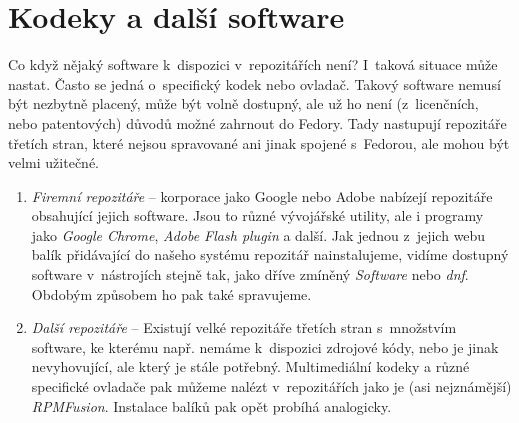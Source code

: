 \section*{Kodeky a další software}
Co když nějaký software k~dispozici v~repozitářích není? I~taková situace může nastat. Často se jedná o~specifický kodek nebo ovladač. Takový software nemusí být nezbytně placený, může být volně dostupný, ale už ho není (z~licenčních, nebo patentových) důvodů možné zahrnout do Fedory. Tady nastupují repozitáře třetích stran, které nejsou spravované ani jinak spojené s~Fedorou, ale mohou být velmi užitečné.

\begin{enumerate}
\item \emph{Firemní repozitáře} -- korporace jako Google nebo Adobe nabízejí repozitáře obsahující jejich software. Jsou to různé vývojářské utility, ale i programy jako \emph{Google Chrome}, \emph{Adobe Flash plugin} a další. Jak jednou z~jejich webu balík přidávající do našeho systému repozitář nainstalujeme, vidíme dostupný software v~nástrojích stejně tak, jako dříve zmíněný \emph{Software} nebo \emph{dnf}. Obdobým způsobem ho pak také spravujeme.

\item \emph{Další repozitáře} -- Existují velké repozitáře třetích stran s~množstvím software, ke kterému např. nemáme k~dispozici zdrojové kódy, nebo je jinak nevyhovující, ale který je stále potřebný. Multimediální kodeky a různé specifické ovladače pak můžeme nalézt v~repozitářích jako je (asi nejznámější) \emph{RPMFusion}. Instalace balíků pak opět probíhá analogicky.
\end{enumerate}

